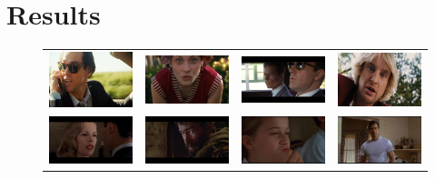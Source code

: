 \section{Results}

\begin{figure}
\begin{center}
\begin{tabular}{cccc}
\includegraphics[width=0.2\linewidth]
  {fig/close-ups/01.jpg} 
& \includegraphics[width=0.2\linewidth]
  {fig/close-ups/02.jpg}  
& \includegraphics[width=0.2\linewidth]
  {fig/close-ups/10.jpg}   
& \includegraphics[width=0.2\linewidth]
  {fig/close-ups/15.jpg}
\\
\includegraphics[width=0.2\linewidth]
  {fig/close-ups/05.jpg} 
& \includegraphics[width=0.2\linewidth]
  {fig/close-ups/06.jpg}  
& \includegraphics[width=0.2\linewidth]
  {fig/close-ups/07.jpg}   
& \includegraphics[width=0.2\linewidth]
  {fig/close-ups/08.jpg}
\\


\end{tabular}
\end{center}
\end{figure}
